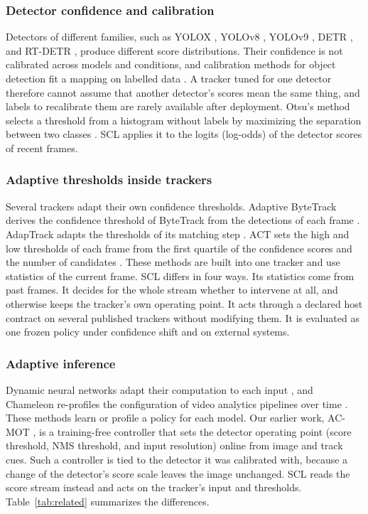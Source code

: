 \documentclass[pdflatex,sn-mathphys-num,iicol]{sn-jnl}
\newcommand{\scl}{SCL}
\begin{document}
\subsubsection{Detector confidence and calibration}
Detectors of different families, such as YOLOX \cite{ge2021yolox}, YOLOv8
\cite{jocher2023yolov8}, YOLOv9 \cite{wang2024yolov9}, DETR
\cite{carion2020detr}, and RT-DETR
\cite{zhao2024rtdetr}, produce different score distributions. Their confidence
is not calibrated across models and conditions, and calibration methods for
object detection fit a mapping on labelled data \cite{kuppers2020detcalib}.
A tracker tuned for one detector therefore cannot assume that another
detector's scores mean the same thing, and labels to recalibrate them are
rarely available after deployment. Otsu's method selects a threshold from a histogram without labels by
maximizing the separation between two classes \cite{otsu1979}. \scl{}
applies it to the logits (log-odds) of the detector scores of recent frames.

\subsubsection{Adaptive thresholds inside trackers}
Several trackers adapt their own confidence thresholds. Adaptive ByteTrack
derives the confidence threshold of ByteTrack from the detections of each
frame \cite{ma2023adaptivebytetrack}. AdapTrack adapts the thresholds of its
matching step \cite{shim2024adaptrack}. ACT sets the high and low thresholds
of each frame from the first quartile of the confidence scores and the number
of candidates \cite{act2026adaptive}. These methods are built into one tracker
and use statistics of the current frame. \scl{} differs in
four ways. Its statistics come from past frames. It decides for the whole
stream whether to intervene at all, and otherwise keeps the tracker's own
operating point. It acts through a declared host contract on several
published trackers without modifying them. It is evaluated as one frozen
policy under confidence shift and on external systems.

\subsubsection{Adaptive inference}
Dynamic neural networks adapt their computation to each input
\cite{han2022dynamic}, and Chameleon re-profiles the configuration of video
analytics pipelines over time \cite{jiang2018chameleon}. These methods learn or
profile a policy for each model. Our earlier work, AC-MOT \cite{ismail2026acmot},
is a training-free controller that sets the detector operating point (score
threshold, NMS threshold, and input resolution) online from image and track
cues. Such a controller is tied to the detector it was calibrated with,
because a change of the detector's score scale leaves the image unchanged.
\scl{} reads the score stream instead and acts on the
tracker's input and thresholds. Table~\ref{tab:related} summarizes the
differences.
\end{document}
